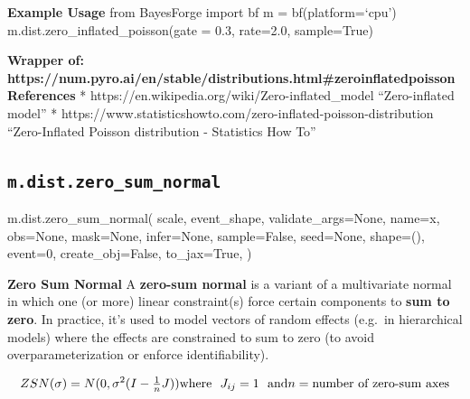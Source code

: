 \documentclass[
  letterpaper,
  DIV=11,
  numbers=noendperiod]{scrartcl}
\newenvironment{Shaded}{\begin{snugshade}}{\end{snugshade}}
\newcommand{\DecValTok}[1]{\textcolor[rgb]{0.68,0.00,0.00}{#1}}
\newcommand{\NormalTok}[1]{\textcolor[rgb]{0.00,0.23,0.31}{#1}}
\newcommand{\OperatorTok}[1]{\textcolor[rgb]{0.37,0.37,0.37}{#1}}
\newcommand{\StringTok}[1]{\textcolor[rgb]{0.13,0.47,0.30}{#1}}
\newcommand{\VariableTok}[1]{\textcolor[rgb]{0.07,0.07,0.07}{#1}}
\begin{document}
\textbf{Example Usage} from BayesForge import bf m = bf(platform=`cpu')
m.dist.zero\_inflated\_poisson(gate = 0.3, rate=2.0, sample=True)

\textbf{Wrapper of:
https://num.pyro.ai/en/stable/distributions.html\#zeroinflatedpoisson}
\textbf{References} * https://en.wikipedia.org/wiki/Zero-inflated\_model
``Zero-inflated model'' *
https://www.statisticshowto.com/zero-inflated-poisson-distribution
``Zero-Inflated Poisson distribution - Statistics How To''

\subsection{\texorpdfstring{\texttt{m.dist.zero\_sum\_normal}}{m.dist.zero\_sum\_normal}}\label{zero_sum_normal}

\begin{Shaded}
\begin{Highlighting}[]
\NormalTok{m.dist.zero\_sum\_normal(}
\NormalTok{    scale,}
\NormalTok{    event\_shape,}
\NormalTok{    validate\_args}\OperatorTok{=}\VariableTok{None}\NormalTok{,}
\NormalTok{    name}\OperatorTok{=}\StringTok{\textquotesingle{}x\textquotesingle{}}\NormalTok{,}
\NormalTok{    obs}\OperatorTok{=}\VariableTok{None}\NormalTok{,}
\NormalTok{    mask}\OperatorTok{=}\VariableTok{None}\NormalTok{,}
\NormalTok{    infer}\OperatorTok{=}\VariableTok{None}\NormalTok{,}
\NormalTok{    sample}\OperatorTok{=}\VariableTok{False}\NormalTok{,}
\NormalTok{    seed}\OperatorTok{=}\VariableTok{None}\NormalTok{,}
\NormalTok{    shape}\OperatorTok{=}\NormalTok{(),}
\NormalTok{    event}\OperatorTok{=}\DecValTok{0}\NormalTok{,}
\NormalTok{    create\_obj}\OperatorTok{=}\VariableTok{False}\NormalTok{,}
\NormalTok{    to\_jax}\OperatorTok{=}\VariableTok{True}\NormalTok{,}
\NormalTok{)}
\end{Highlighting}
\end{Shaded}

\textbf{Zero Sum Normal} A \textbf{zero-sum normal} is a variant of a
multivariate normal in which one (or more) linear constraint(s) force
certain components to \textbf{sum to zero}. In practice, it's used to
model vectors of random effects (e.g.~in hierarchical models) where the
effects are constrained to sum to zero (to avoid overparameterization or
enforce identifiability).

\[
  ZSN(\sigma) = N(0, \sigma^2 (I - \tfrac{1}{n}J)) \\
  \text{where} \ ~ J_{ij} = 1 \ ~ \text{and} \\
  n = \text{number of zero-sum axes}
  \]
\end{document}
